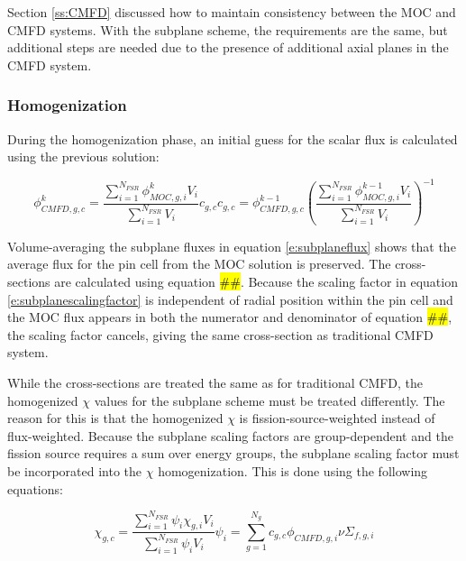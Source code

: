 Section \ref{ss:CMFD} discussed how to maintain consistency between the MOC and CMFD systems.  With the subplane scheme, the requirements are the same, but additional steps are needed due to the presence of additional axial planes in the CMFD system.

\subsubsection{Homogenization}

During the homogenization phase, an initial guess for the scalar flux is calculated using the previous solution:

\begin{subequations}
\begin{equation}\label{e:subplaneflux}
\phi_{CMFD,g,c}^k = \frac{\sum_{i=1}^{N_{FSR}} \phi_{MOC,g,i}^{k}V_i}{\sum_{i=1}^{N_{FSR}}V_i} c_{g,c}
\end{equation}
\begin{equation}\label{e:subplanescalingfactor}
c_{g,c}=\phi_{CMFD,g,c}^{k-1}\left(\frac{\sum_{i=1}^{N_{FSR}} \phi_{MOC,g,i}^{k-1}V_i}{\sum_{i=1}^{N_{FSR}}V_i}\right)^{-1}
\end{equation}
\end{subequations}

Volume-averaging the subplane fluxes in equation \ref{e:subplaneflux} shows that the average flux for the pin cell from the MOC solution is preserved.  The cross-sections are calculated using equation \hl{\#\#}.  Because the scaling factor in equation \ref{e:subplanescalingfactor} is independent of radial position within the pin cell and the MOC flux appears in both the numerator and denominator of equation \hl{\#\#}, the scaling factor cancels, giving the same cross-section as traditional CMFD system.

While the cross-sections are treated the same as for traditional CMFD, the homogenized $\chi$ values for the subplane scheme must be treated differently.  The reason for this is that the homogenized $\chi$ is fission-source-weighted instead of flux-weighted.  Because the subplane scaling factors are group-dependent and the fission source requires a sum over energy groups, the subplane scaling factor must be incorporated into the $\chi$ homogenization.  This is done using the following equations:

\begin{subequations}
\begin{equation}
\chi_{g,c} = \frac{\sum_{i=1}^{N_{FSR}} \psi_i \chi_{g,i} V_i}{\sum_{i=1}^{N_{FSR}} \psi_i V_i}
\end{equation}
\begin{equation}
\psi_{i} = \sum_{g=1}^{N_g} c_{g,c} \phi_{CMFD,g,i} \nu\Sigma_{f,g,i} 
\end{equation}
\end{subequations}

